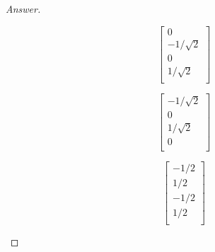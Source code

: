 \documentclass[../psets.tex]{subfiles}
\begin{document}
\begin{enumerate}
\begin{enumerate}
\begin{proof}[Answer]
\begin{figure}[h!]
\begin{subfigure}[b]{0.2\linewidth}
                    \begin{equation*}
                        \boxed{
                            \begin{bmatrix}
                                0\\
                                -1/\sqrt{2}\\
                                0\\
                                1/\sqrt{2}\\
                            \end{bmatrix}
                        }
                    \end{equation*}
                    \caption{}
                \end{subfigure}
                \begin{subfigure}[b]{0.2\linewidth}
                    \centering
                    \begin{equation*}
                        \boxed{
                            \begin{bmatrix}
                                -1/\sqrt{2}\\
                                0\\
                                1/\sqrt{2}\\
                                0\\
                            \end{bmatrix}
                        }
                    \end{equation*}
                    \caption{}
                \end{subfigure}
                \begin{subfigure}[b]{0.2\linewidth}
                    \centering
                    \begin{equation*}
                        \boxed{
                            \begin{bmatrix}
                                -1/2\\
                                1/2\\
                                -1/2\\
                                1/2\\
                            \end{bmatrix}
                        }
                    \end{equation*}
                    \caption{}
                \end{subfigure}

\end{figure}
\end{proof}
\end{enumerate}
\end{enumerate}
\end{document}
